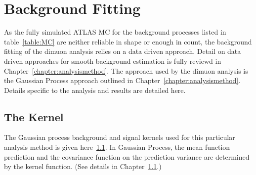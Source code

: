 %

\section{Background Fitting}
As the fully simulated ATLAS MC for the background processes listed in table~\ref{table:MC} are neither reliable in shape or enough in count, the background fitting of the dimuon analysis relies on a data driven approach. Detail on data driven approaches for smooth background estimation is fully reviewd in Chapter~\ref{chapter:analysismethod}. The approach used by the dimuon analysis is the Gaussian Process approach outlined in Chapter~\ref{chapter:analysismethod}. Details specific to the analysis and results are detailed here.

\subsection{The Kernel}
The Gaussian process background and signal kernels used for this particular analysis method is given here~\ref{}. In Gaussian Process, the mean function prediction and the covariance function on the prediction variance are determined by the kernel function. (See details in Chapter~\ref{}.)

